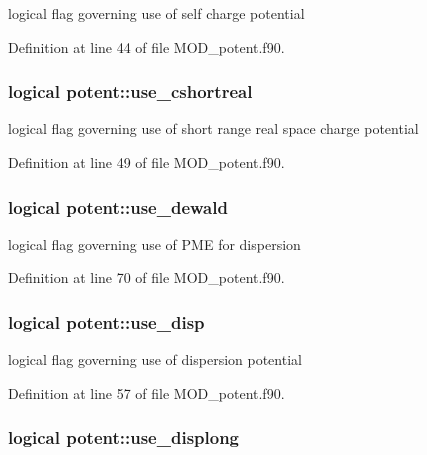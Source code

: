 logical flag governing use of self charge potential 



Definition at line 44 of file M\-O\-D\-\_\-potent.\-f90.

\hypertarget{classpotent_a06a4cfb9960a168b860e50c0c70b0cf3}{
\subsubsection[{use\-\_\-cshortreal}]{\setlength{\rightskip}{0pt plus 5cm}logical potent\-::use\-\_\-cshortreal}}\label{classpotent_a06a4cfb9960a168b860e50c0c70b0cf3}


logical flag governing use of short range real space charge potential 



Definition at line 49 of file M\-O\-D\-\_\-potent.\-f90.

\hypertarget{classpotent_af98f8da51858efb89951f38aface351c}{
\subsubsection[{use\-\_\-dewald}]{\setlength{\rightskip}{0pt plus 5cm}logical potent\-::use\-\_\-dewald}}\label{classpotent_af98f8da51858efb89951f38aface351c}


logical flag governing use of P\-M\-E for dispersion 



Definition at line 70 of file M\-O\-D\-\_\-potent.\-f90.

\hypertarget{classpotent_aada9db6176ba5bf4284f84a4b9b182e3}{
\subsubsection[{use\-\_\-disp}]{\setlength{\rightskip}{0pt plus 5cm}logical potent\-::use\-\_\-disp}}\label{classpotent_aada9db6176ba5bf4284f84a4b9b182e3}


logical flag governing use of dispersion potential 



Definition at line 57 of file M\-O\-D\-\_\-potent.\-f90.

\hypertarget{classpotent_a30c7aa564a7e6e64aadea0a17c50fcb7}{
\subsubsection[{use\-\_\-displong}]{\setlength{\rightskip}{0pt plus 5cm}logical potent\-::use\-\_\-displong}}\label{classpotent_a30c7aa564a7e6e64aadea0a17c50fcb7}


